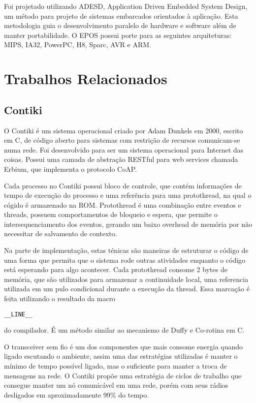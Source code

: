 Foi projetado utilizando ADESD, Application Driven Embedded System Design, um m\'etodo para projeto de sistemas embarcados orientados \`a aplica\c{c}\~ao. Esta metodologia guia o desenvolvimento paralelo de hardware e software al\'em de manter portabilidade. O EPOS possui porte para as seguintes arquiteturas: MIPS, IA32, PowerPC, H8, Sparc, AVR e ARM.

\cite{epos}

\section{Trabalhos Relacionados}

\subsection{Contiki}
O Contiki \'e um sistema operacional criado por Adam Dunkels em 2000, escrito em C, de c\'odigo aberto para sistemas com restri\c{c}\~ao de recursos comunicam-se numa rede. Foi desenvolvido para ser um sistema operacional para Internet das coisas. Possui uma camada de abstra\c{c}\~ao RESTful para web services chamada Erbium, que implementa o protocolo CoAP.

Cada processo no Contiki possui bloco de controle, que cont\'em informa\-\c{c}\~oes de tempo de execu\c{c}\~ao do processo e uma refer\^encia para uma protothread, na qual o c\'ogido \'e armazenado na ROM. Protothread \'e uma combina\c{c}\~ao entre eventos e threads, possuem comportamentos de bloqueio e espera, que permite o intersequenciamento dos eventos, gerando um baixo overhead de mem\'oria por n\~ao necessitar de salvamento de contexto.

Na parte de implementa\c{c}\~ao, estas t\'enicas s\~ao maneiras de estruturar o c\'odigo de uma forma que permita que o sistema rode outras atividades enquanto o c\'odigo est\'a esperando para algo acontecer. Cada protothread consome 2 bytes de mem\'oria, que s\~ao utilizados para armazenar a continuidade local, uma referencia utilizada em um pulo condicional durante a execu\c{c}\~ao da thread. Essa marca\c{c}\~ao \'e feita utilizando o resultado da macro \begin{verbatim}__LINE__\end{verbatim} do compilador. \'E um m\'etodo similar ao mecanismo de Duffy e Co-rotina em C. \cite{duffy}

O transceiver sem fio \'e um dos componentes que mais consome energia quando ligado escutando o ambiente, assim uma das estrat\'egias utilizadas \'e manter o m\'inimo de tempo poss\'ivel ligado, mas o suficiente para manter a troca de mensagens na rede. O Contiki prop\~oe uma estrat\'egia de ciclos de trabalho que consegue manter um n\'o comunic\'avel em uma rede, por\'em com seus r\'adios desligados em aproximadamente 99\% do tempo.

